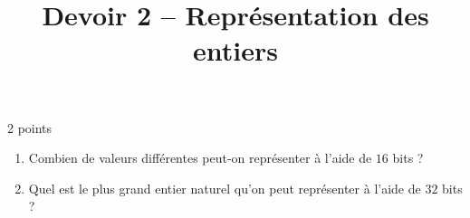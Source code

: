 \documentclass[a4paper,dvipsnames]{article}
\title{Devoir 2 -- Représentation des entiers}
\author{}
\date{}
\begin{document}
\renewcommand{\contentsname}{}

\pagestyle{fancy}

\begin{tcolorbox}[colframe=blue!75, colback=blue!45, valign=center, height=1.5cm, top=5mm]
  \maketitle
\end{tcolorbox}


\vspace{1cm}

\thispagestyle{fancy}

\begin{exercice}{2 points}{}
 \begin{enumerate}
   \item Combien de valeurs différentes peut-on représenter à l'aide de $16$ bits ?
   \item Quel est le plus grand entier naturel qu'on peut représenter à l'aide de $32$ bits ?
 \end{enumerate} 
\end{exercice}

\medskip
\end{document}
